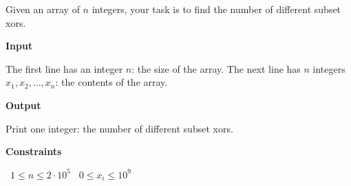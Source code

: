 Given an array of $n$ integers, your task is to find the number of different subset xors.

\vspace{0.3cm}\noindent\textbf{Input}

The first line has an integer $n$: the size of the array.
The next line has $n$ integers $x_1,x_2,\dots,x_n$: the contents of the array.

\vspace{0.3cm}\noindent\textbf{Output}

Print one integer: the number of different subset xors.

\vspace{0.3cm}\noindent\textbf{Constraints}

\textbullet\ $1 \le n \le 2 \cdot 10^5$
\textbullet\ $0 \le x_i \le 10^9$